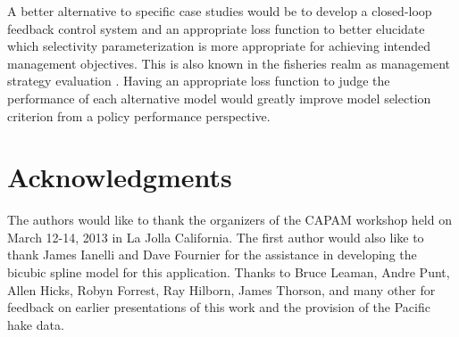 
A better alternative to specific case studies would be to develop a closed-loop feedback control system and an appropriate loss function to better elucidate which selectivity parameterization is more appropriate for achieving intended management objectives.  This is also known in the fisheries realm as management strategy evaluation \citep{de1986simulation,Cooke1999,smith1999implementing}.  Having an appropriate loss function to judge the performance of each alternative model would greatly improve model selection criterion from a policy performance perspective.


\section*{Acknowledgments} %
\label{sec:acknowledgments}
	The authors would like to thank the organizers of the CAPAM workshop held on March 12-14, 2013 in La Jolla California.  The first author would also like to thank James Ianelli and Dave Fournier for the assistance in developing the bicubic spline model for this application.  Thanks to Bruce Leaman, Andre Punt, Allen Hicks, Robyn Forrest, Ray Hilborn, James Thorson, and many other for feedback on earlier presentations of this work and the provision of the Pacific hake data.
